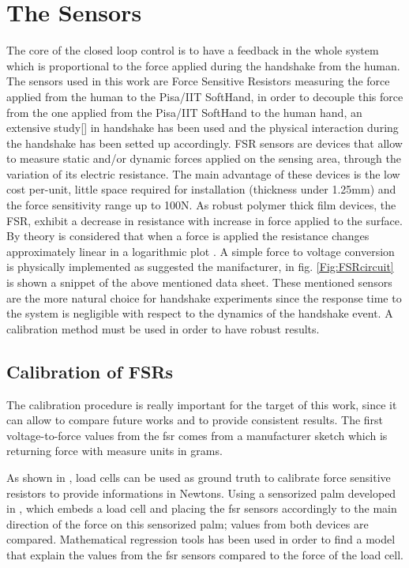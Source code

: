 \section{The Sensors}
The core of the closed loop control is to have a feedback in the whole system which is proportional to the force applied during the handshake from the human. 
The sensors used in this work are Force Sensitive Resistors measuring the force applied from the human to the Pisa/IIT SoftHand, in order to decouple this force from the one applied from the Pisa/IIT SoftHand to the human hand, an extensive study[\cite{espen}] in handshake has been used and the physical interaction during the handshake has been setted up accordingly.
FSR sensors are devices that allow to measure static and/or dynamic forces applied on the sensing area, through the variation of its electric resistance. The main advantage of these devices is the low cost per-unit, little space required for installation (thickness under 1.25mm) and the force sensitivity range up to 100N.
As robust polymer thick film devices, the FSR, exhibit a decrease in resistance with increase in force applied to the surface. By theory is considered that when a force is applied the resistance changes approximately linear in a logarithmic plot \cite{fsrdatasheet}.
A simple force to voltage conversion is physically implemented as suggested the manifacturer, in fig. \ref{Fig:FSRcircuit} is shown a snippet of the above mentioned data sheet. 
These mentioned sensors are the more natural choice for handshake experiments since the response time to the system is negligible with respect to the dynamics of the handshake event. A calibration method must be used in order to have robust results.

\subsection{Calibration of FSRs}
The calibration procedure is really important for the target of this work, since it can allow to compare future works and to provide consistent results. 
The first voltage-to-force values from the fsr comes from a manufacturer sketch which is returning force with measure units in grams.


As shown in \cite{calibFSR}, load cells can be used as ground truth to calibrate force sensitive resistors to provide informations in Newtons. 
Using a sensorized palm developed in \cite{espen}, which embeds a load cell and placing the fsr sensors accordingly to the main direction of the force on this sensorized palm; values from both devices are compared.
Mathematical regression tools has been used in order to find a model that explain the values from the fsr sensors compared to the force of the load cell.

